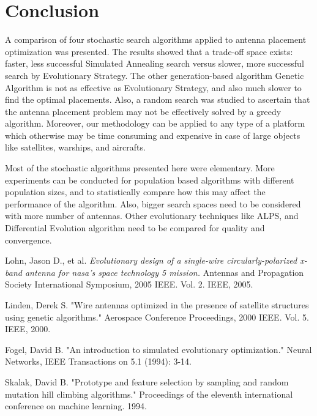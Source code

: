 \documentclass[conference]{IEEEtran}
\begin{document}
\section{Conclusion}
A comparison of four stochastic search algorithms applied to antenna placement optimization was presented. The results showed that a trade-off space exists: faster, less successful Simulated Annealing search versus slower, more successful search by Evolutionary Strategy. The other generation-based algorithm Genetic Algorithm is not as effective as Evolutionary Strategy, and also much slower to find the optimal placements. Also, a random search was studied to ascertain that the antenna placement problem may not be effectively solved by a greedy algorithm. Moreover, our methodology can be applied to any type of a platform which otherwise may be time consuming and expensive in case of large objects like satellites, warships, and aircrafts. 

Most of the stochastic algorithms presented here were elementary. More experiments can be conducted for population based algorithms with different population sizes, and to statistically compare how this may affect the performance of the algorithm. Also, bigger search spaces need to be considered with more number of antennas. Other evolutionary techniques like ALPS, and Differential Evolution algorithm need to be compared for quality and convergence.

\begin{thebibliography}{1}

Lohn, Jason D., et al. \emph{Evolutionary design of a single-wire circularly-polarized x-band antenna for nasa's space technology 5 mission.} Antennas and Propagation Society International Symposium, 2005 IEEE. Vol. 2. IEEE, 2005.

Linden, Derek S. "Wire antennas optimized in the presence of satellite structures using genetic algorithms." Aerospace Conference Proceedings, 2000 IEEE. Vol. 5. IEEE, 2000.

Fogel, David B. "An introduction to simulated evolutionary optimization." Neural Networks, IEEE Transactions on 5.1 (1994): 3-14.

Skalak, David B. "Prototype and feature selection by sampling and random mutation hill climbing algorithms." Proceedings of the eleventh international conference on machine learning. 1994.
\end{thebibliography}
\end{document}
